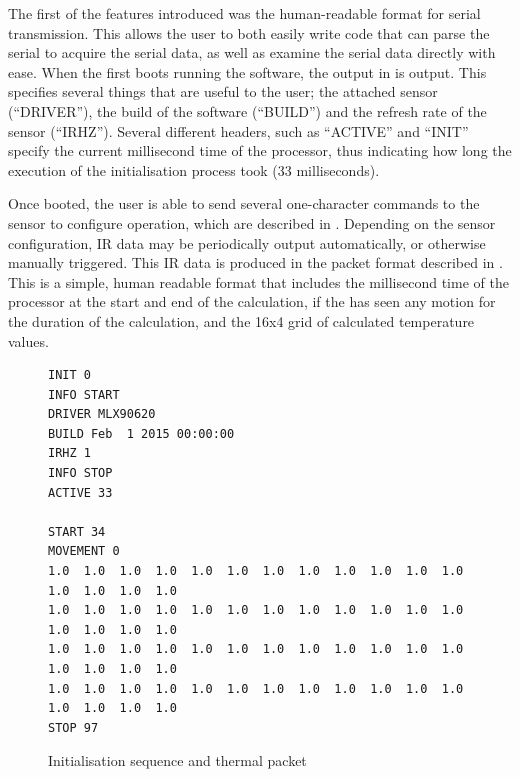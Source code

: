 \documentclass[../thesis/thesis.tex]{subfiles}
\begin{document}
The first of the features introduced was the human-readable format for serial transmission. This allows the user to both easily write code that can parse the serial to acquire the serial data, as well as examine the serial data directly with ease. When the \ard first boots running the software, the output in  is output. This specifies several things that are useful to the user; the attached sensor (``DRIVER''), the build of the software (``BUILD'') and the refresh rate of the sensor (``IRHZ''). Several different headers, such as ``ACTIVE'' and ``INIT'' specify the current millisecond time of the processor, thus indicating how long the execution of the initialisation process took (33 milliseconds).

Once booted, the user is able to send several one-character commands to the sensor to configure operation, which are described in . Depending on the sensor configuration, IR data may be periodically output automatically, or otherwise manually triggered. This IR data is produced in the packet format described in . This is a simple, human readable format that includes the millisecond time of the processor at the start and end of the calculation, if the \pir has seen any motion for the duration of the calculation, and the 16x4 grid of calculated temperature values.

\begin{figure}
 \centering
\begin{verbatim}
INIT 0
INFO START
DRIVER MLX90620
BUILD Feb  1 2015 00:00:00
IRHZ 1
INFO STOP
ACTIVE 33

START 34
MOVEMENT 0
1.0  1.0  1.0  1.0  1.0  1.0  1.0  1.0  1.0  1.0  1.0  1.0  1.0  1.0  1.0  1.0
1.0  1.0  1.0  1.0  1.0  1.0  1.0  1.0  1.0  1.0  1.0  1.0  1.0  1.0  1.0  1.0
1.0  1.0  1.0  1.0  1.0  1.0  1.0  1.0  1.0  1.0  1.0  1.0  1.0  1.0  1.0  1.0
1.0  1.0  1.0  1.0  1.0  1.0  1.0  1.0  1.0  1.0  1.0  1.0  1.0  1.0  1.0  1.0
STOP 97
\end{verbatim}
\caption{Initialisation sequence and thermal packet}
\label{fig:code:initseq}
\end{figure}
\end{document}
